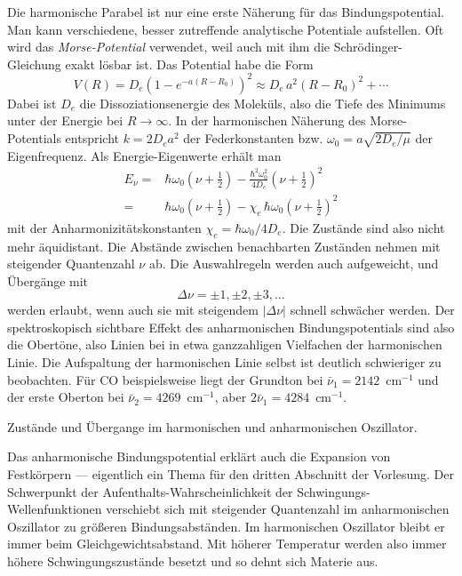 Die harmonische Parabel ist nur eine erste Näherung für das Bindungspotential. Man kann verschiedene, besser zutreffende analytische Potentiale aufstellen. Oft wird das \emph{Morse-Potential} verwendet, weil auch mit ihm  die Schrödinger-Gleichung exakt lösbar ist. Das Potential habe die Form
\begin{equation}
 V(R) = D_e \left( 1 - e^{-a (R - R_0)} \right)^2 \approx D_e \, a^2 (R - R_0)^2 + \cdots
\end{equation}
Dabei ist $D_e$ die Dissoziationsenergie des Moleküls, also die Tiefe des Minimums unter der Energie bei $R \rightarrow \infty$. In der harmonischen Näherung des Morse-Potentials entspricht $k = 2 D_e a^2$ der Federkonstanten bzw. $\omega_0 = a \sqrt{2 D_e / \mu}$ der Eigenfrequenz. Als Energie-Eigenwerte erhält man
\begin{align}
 E_\nu =&  \hbar \omega_0 \left( \nu  + \frac{1}{2} \right)
 - \frac{\hbar^2 \omega_0^2}{4 D_e} \left( \nu  + \frac{1}{2} \right)^2 \\
 = &
 \hbar \omega_0 \left( \nu  + \frac{1}{2} \right)
 - \chi_e \, \hbar \omega_0  \left( \nu  + \frac{1}{2} \right)^2
\end{align}
mit der Anharmonizitätskonstanten $\chi_e =\hbar \omega_0 / 4 D_e$.
Die Zustände sind also nicht mehr äquidistant. Die Abstände zwischen benachbarten Zuständen nehmen mit steigender Quantenzahl $\nu$ ab. Die Auswahlregeln werden auch aufgeweicht, und Übergänge mit 
\begin{equation}
\Delta \nu = \pm 1, \pm 2 , \pm 3, \dots
\end{equation}
werden erlaubt, wenn auch sie mit steigendem $|\Delta \nu |$ schnell schwächer werden. Der spektroskopisch sichtbare Effekt des anharmonischen Bindungspotentials sind also die Obertöne, also Linien bei in etwa ganzzahligen Vielfachen der harmonischen Linie. Die Aufspaltung der harmonischen Linie selbst ist deutlich schwieriger zu beobachten. Für CO beispielsweise liegt der Grundton bei $\bar{\nu}_1 = 2142$~cm$^{-1}$ und der erste Oberton bei 
 $\bar{\nu}_2 = 4269$~cm$^{-1}$, aber $2 \bar{\nu}_1 = 4284$~cm$^{-1}$.
 
\begin{marginfigure}
\caption{Zustände und Übergange im harmonischen und anharmonischen Oszillator.}
\end{marginfigure}
 
 
 
Das anharmonische Bindungspotential erklärt auch die Expansion von Festkörpern --- eigentlich ein Thema für den dritten Abschnitt der Vorlesung. Der Schwerpunkt der Aufenthalts-Wahrscheinlichkeit der Schwingungs-Wellenfunktionen verschiebt sich mit steigender Quantenzahl im anharmonischen Oszillator zu größeren Bindungsabständen. Im harmonischen Oszillator bleibt er immer beim Gleichgewichtsabstand. Mit höherer Temperatur werden also immer höhere Schwingungszustände besetzt und so dehnt sich Materie aus.


